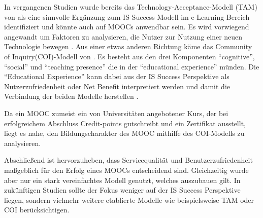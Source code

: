In vergangenen Studien wurde bereits das Technology-Acceptance-Modell (TAM) von \textcite{bagozzi1992development} als eine sinnvolle Ergänzung zum IS Success Modell im e-Learning-Bereich identifiziert \parencite{mohammadi2015factors} und könnte auch auf MOOCs anwendbar sein. Es wird vorwiegend angewandt um Faktoren zu analysieren, die Nutzer zur Nutzung einer neuen Technologie bewegen \parencite[vgl.][S.702]{mohammadi2015factors}.  
Aus einer etwas anderen Richtung käme das Community of Inquiry(COI)-Modell von \textcite{garrison1999critical}. Es besteht aus den drei Komponenten "`cognitive"',  "`social"' und "`teaching presence"' die in der "`educational experience"'  münden. Die "`Educational Experience"' kann dabei aus der IS Success Perspektive als Nutzerzufriedenheit oder Net Benefit interpretiert werden und damit die Verbindung der beiden Modelle herstellen \parencite[vgl.][S.179]{freeze2010success}.

Da ein MOOC zumeist ein von Universitäten angebotener Kurs, der bei erfolgreichem Abschluss Credit-points gutschreibt und ein Zertifikat ausstellt, liegt es nahe, den Bildungscharakter des MOOC mithilfe des COI-Modells zu analysieren.     

\par

Abschließend ist hervorzuheben, dass Servicequalität und Benutzerzufriedenheit maßgeblich für den Erfolg eines MOOCs entscheidend sind. Gleichzeitig wurde aber nur ein stark vereinfachtes Modell genutzt, welches auszubauen gilt. In zukünftigen Studien sollte der Fokus weniger auf der IS Success Perspektive liegen, sondern vielmehr weitere etablierte Modelle wie beispielsweise TAM oder COI berücksichtigen.

